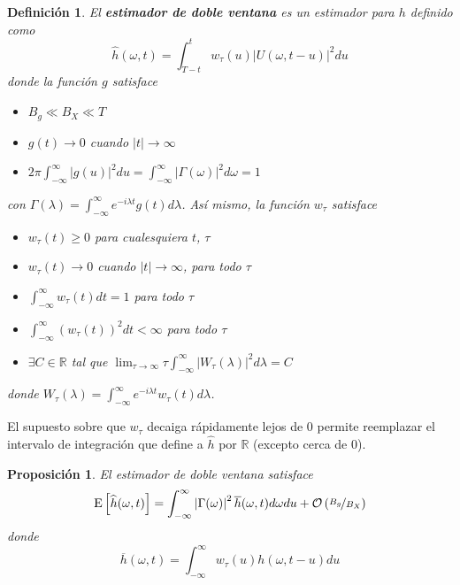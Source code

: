 \documentclass[12pt,letterpaper]{book}
\newtheorem{definicion}{Definición}[chapter]
\newtheorem{proposicion}[teorema]{Proposición}
\newcommand{\R}{\mathbb{R}}
\newcommand{\intR}{\int_{-\infty}^{\infty}}
\newcommand{\E}[1]{\mathrm{E}\left[ #1 \right]}
\newcommand{\abso}[1]{\left| #1 \right|}
\newcommand{\orden}[1]{\mathcal{O}\left( #1 \right)}
\begin{document}
\begin{definicion}
El \textbf{estimador de doble ventana} es un estimador para $h$ definido como
\begin{equation}
\widehat{h}(\omega, t) = \int_{T-t}^{t} w_\tau (u) \abso{U(\omega,t-u)}^{2} du
\end{equation}
donde la función $g$ satisface
\begin{itemize}
\item $B_g \ll B_X \ll T$
\item $g(t) \rightarrow 0$ cuando $\abso{t} \rightarrow \infty$
\item $2\pi \intR \abso{g(u)}^{2} du = \intR \abso{\Gamma(\omega)}^{2} d\omega = 1$
\end{itemize}
con $\Gamma(\lambda) = \intR e^{-i \lambda t} g(t) d\lambda$. Así mismo, la función $w_\tau$ satisface
\begin{itemize}
\item $w_\tau(t) \geq 0$ para cualesquiera $t$, $\tau$
\item $w_\tau(t) \rightarrow 0$ cuando $\abso{t} \rightarrow \infty$, para todo $\tau$
\item $\displaystyle \intR w_\tau(t) dt = 1$ para todo $\tau$
\item $\displaystyle \intR \left( w_\tau(t) \right)^{2} dt < \infty$ para todo $\tau$
\item $\exists C \in \R$ tal que  
$\displaystyle \lim_{\tau\rightarrow\infty} \tau \intR \abso{ W_{\tau}(\lambda) }^{2} d\lambda = C$
\end{itemize}
donde $W_\tau(\lambda) = \intR e^{-i \lambda t} w_\tau(t) d\lambda$.
\label{estimador_doble_ventana}
\end{definicion}

El supuesto sobre que $w_\tau$ decaiga rápidamente lejos de 0 permite reemplazar el intervalo de integración que define a $\widehat{h}$ por $\R$ (excepto cerca de 0). 

\begin{proposicion}
El estimador de doble ventana satisface
\begin{equation}
\E{\widehat{h}(\omega, t)} = \intR \abso{\Gamma(\omega)}^{2} \overline{h}(\omega,t) d\omega du +
\orden{\nicefrac{B_g}{B_X}}
\end{equation}
donde
\begin{equation}
\overline{h}(\omega,t) = \intR w_\tau (u) h(\omega, t-u) du
\end{equation}
\label{lazy:med_dd}
\end{proposicion}
\end{document}
